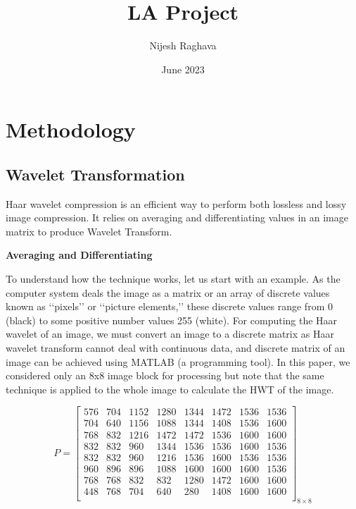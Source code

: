 \documentclass{article}
\title{LA Project}
\author{Nijesh Raghava}
\date{June 2023}
\begin{document}
\maketitle

\section{Methodology}
\subsection{Wavelet Transformation}
\setlength{\parindent}{1cm}
Haar wavelet compression is an eﬃcient way to perform both lossless and lossy image compression. It relies on averaging and differentiating values in an image matrix to produce Wavelet Transform.

\begin{center}
  \large\textbf{Averaging and Differentiating}
\end{center}

\setlength{\parindent}{1cm}
To understand how the technique works, let us start with an example. As the computer system deals the image as a matrix or an array of discrete values known as ‘‘pixels’’ or ‘‘picture elements,’’ these discrete values range from 0 (black) to some positive number values 255 (white). For computing the Haar wavelet of an image, we must convert an image to a discrete matrix as Haar wavelet transform cannot deal with continuous data, and discrete matrix of an image can be achieved using MATLAB (a programming tool). In this paper, we considered only an 8x8 image block for processing but note that the same technique is applied to the whole image to calculate the HWT of the image.

\begin{equation*}
    P = \begin{bmatrix}
        576 & 704 & 1152 & 1280 & 1344 & 1472 & 1536 & 1536 \\
        704 & 640 & 1156 & 1088 & 1344 & 1408 & 1536 & 1600 \\
        768 & 832 & 1216 & 1472 & 1472 & 1536 & 1600 & 1600 \\
        832 & 832 & 960 & 1344 & 1536 & 1536 & 1600 & 1536 \\
        832 & 832 & 960 & 1216 & 1536 & 1600 & 1536 & 1536 \\
        960 & 896 & 896 & 1088 & 1600 & 1600 & 1600 & 1536 \\
        768 & 768 & 832 & 832 & 1280 & 1472 & 1600 & 1600 \\
        448 & 768 & 704 & 640 & 280 & 1408 & 1600 & 1600 \\
    \end{bmatrix}_{8\times8}    
\end{equation*}
\end{document}
